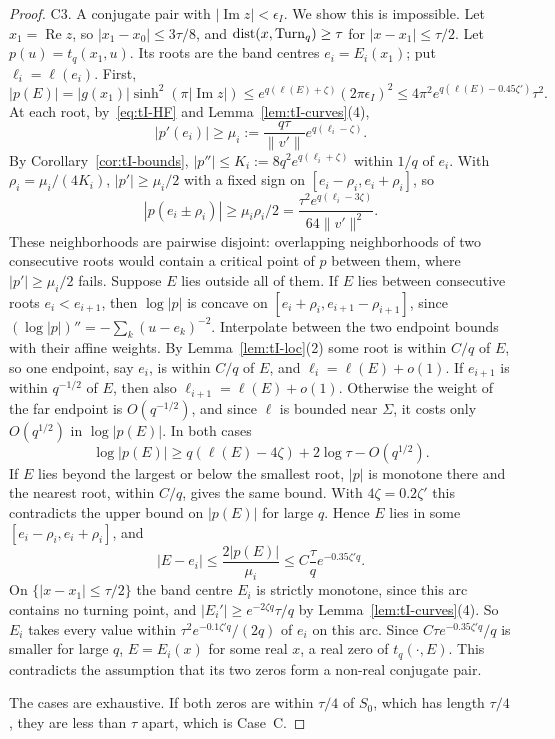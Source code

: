 \begin{proof}
C3. A conjugate pair with $|\operatorname{Im}z|<\epsilon_I$. We show this is impossible. Let $x_1=\operatorname{Re}z$, so $|x_1-x_0|\le3\tau/8$, and $\operatorname{dist}(x,\mathrm{Turn}_q)\ge\tau$ for $|x-x_1|\le\tau/2$. Let $p(u)=t_q(x_1,u)$. Its roots are the band centres $e_i=E_i(x_1)$; put $\ell_i=\ell(e_i)$. First,
\[
|p(E)|=|g(x_1)|\sinh^2(\pi|\operatorname{Im}z|)\le e^{q(\ell(E)+\zeta)}(2\pi\epsilon_I)^2\le4\pi^2e^{q(\ell(E)-0.45\zeta')}\tau^2.
\]
At each root, by~\eqref{eq:tI-HF} and Lemma~\ref{lem:tI-curves}(4),
\[
|p'(e_i)|\ge\mu_i:=\frac{q\tau}{\|v'\|}e^{q(\ell_i-\zeta)}.
\]
By Corollary~\ref{cor:tI-bounds}, $|p''|\le K_i:=8q^2e^{q(\ell_i+\zeta)}$ within $1/q$ of $e_i$. With $\rho_i=\mu_i/(4K_i)$, $|p'|\ge\mu_i/2$ with a fixed sign on $[e_i-\rho_i,e_i+\rho_i]$, so
\[
|p(e_i\pm\rho_i)|\ge\mu_i\rho_i/2=\frac{\tau^2e^{q(\ell_i-3\zeta)}}{64\|v'\|^2}.
\]
These neighborhoods are pairwise disjoint: overlapping neighborhoods of two consecutive roots would contain a critical point of $p$ between them, where $|p'|\ge\mu_i/2$ fails. Suppose $E$ lies outside all of them. If $E$ lies between consecutive roots $e_i<e_{i+1}$, then $\log|p|$ is concave on $[e_i+\rho_i,e_{i+1}-\rho_{i+1}]$, since $(\log|p|)''=-\sum_k(u-e_k)^{-2}$. Interpolate between the two endpoint bounds with their affine weights. By Lemma~\ref{lem:tI-loc}(2) some root is within $C/q$ of $E$, so one endpoint, say $e_i$, is within $C/q$ of $E$, and $\ell_i=\ell(E)+o(1)$. If $e_{i+1}$ is within $q^{-1/2}$ of $E$, then also $\ell_{i+1}=\ell(E)+o(1)$. Otherwise the weight of the far endpoint is $O(q^{-1/2})$, and since $\ell$ is bounded near $\Sigma$, it costs only $O(q^{1/2})$ in $\log|p(E)|$. In both cases
\[
\log|p(E)|\ge q(\ell(E)-4\zeta)+2\log\tau-O(q^{1/2}).
\]
If $E$ lies beyond the largest or below the smallest root, $|p|$ is monotone there and the nearest root, within $C/q$, gives the same bound. With $4\zeta=0.2\zeta'$ this contradicts the upper bound on $|p(E)|$ for large $q$. Hence $E$ lies in some $[e_i-\rho_i,e_i+\rho_i]$, and
\[
|E-e_i|\le\frac{2|p(E)|}{\mu_i}\le C\frac{\tau}{q}e^{-0.35\zeta'q}.
\]
On $\{|x-x_1|\le\tau/2\}$ the band centre $E_i$ is strictly monotone, since this arc contains no turning point, and $|E_i'|\ge e^{-2\zeta q}\tau/q$ by Lemma~\ref{lem:tI-curves}(4). So $E_i$ takes every value within $\tau^2e^{-0.1\zeta'q}/(2q)$ of $e_i$ on this arc. Since $C\tau e^{-0.35\zeta'q}/q$ is smaller for large $q$, $E=E_i(x)$ for some real $x$, a real zero of $t_q(\cdot,E)$. This contradicts the assumption that its two zeros form a non-real conjugate pair.

The cases are exhaustive. If both zeros are within $\tau/4$ of $S_0$, which has length $\tau/4$, they are less than $\tau$ apart, which is Case~C.
\end{proof}

